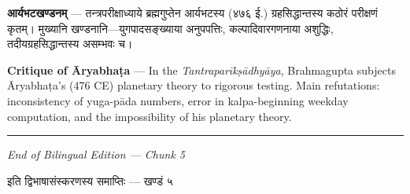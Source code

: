 \documentclass[11pt,a4paper]{article}
\newcommand{\dev}[1]{{\devanagarifont #1}}
\newenvironment{bilingual}{%
  \par\noindent
  \begin{minipage}[t]{0.47\textwidth}%
}{%
  \par\end{minipage}%
}
\newcommand{\rightcol}{%
  \par\end{minipage}%
  \hfill
  \begin{minipage}[t]{0.47\textwidth}%
}
\begin{document}
\medskip

\begin{bilingual}
\textbf{आर्यभटखण्डनम्} --- तन्त्रपरीक्षाध्याये ब्रह्मगुप्तेन आर्यभटस्य (४७६ ई.) ग्रहसिद्धान्तस्य कठोरं परीक्षणं कृतम्। मुख्यानि खण्डनानि---युगपादसङ्ख्याया अनुपपत्तिः, कल्पादिवारगणनाया अशुद्धिः, तदीयग्रहसिद्धान्तस्य असम्भवः च।
\rightcol
\textbf{Critique of Āryabhaṭa} --- In the \textit{Tantraparīkṣādhyāya}, Brahmagupta subjects Āryabhaṭa's (476 CE) planetary theory to rigorous testing. Main refutations: inconsistency of yuga-pāda numbers, error in kalpa-beginning weekday computation, and the impossibility of his planetary theory.
\end{bilingual}

\vspace{1cm}
\begin{center}
\rule{0.4\textwidth}{0.4pt}

\vspace{0.5cm}

{\small\textit{End of Bilingual Edition --- Chunk 5}}

{\small\dev{इति द्विभाषासंस्करणस्य समाप्तिः --- खण्डं ५}}
\end{center}
\end{document}
